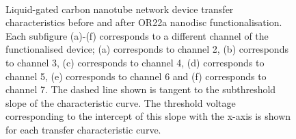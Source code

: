 \documentclass[
  a4paper,
]{scrbook}
\begin{document}
\begin{figure}
\begin{minipage}[t]{0.45\linewidth}
{{}

}

\end{minipage}%
%
\begin{minipage}[t]{0.01\linewidth}

{\centering 

~

}

\end{minipage}%

\caption{\label{fig-OR22a-variability-TX}Liquid-gated carbon nanotube
network device transfer characteristics before and after OR22a nanodisc
functionalisation. Each subfigure (a)-(f) corresponds to a different
channel of the functionalised device; (a) corresponds to channel 2, (b)
corresponds to channel 3, (c) corresponds to channel 4, (d) corresponds
to channel 5, (e) corresponds to channel 6 and (f) corresponds to
channel 7. The dashed line shown is tangent to the subthreshold slope of
the characteristic curve. The threshold voltage corresponding to the
intercept of this slope with the x-axis is shown for each transfer
characteristic curve.}

\end{figure}
\end{document}
